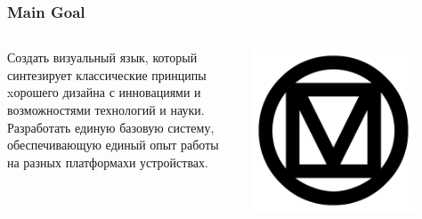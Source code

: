 \documentclass[12pt]{beamer}
\begin{document}
	\begin{frame}
		\frametitle{Main Goal}

        \begin{columns}
            \begin{column}{0.5\textwidth}
                Создать визуальный язык,
                который синтезирует классические принципы
                xорошего дизайна с инновациями
                и возможностями технологий и науки. \\

                Разработать единую базовую систему,
                обеспечивающую единый опыт работы
                на разных платформахи устройствах.
            \end{column}
            
            \begin{column}{0.5\textwidth}
                \includegraphics[width=0.8\textwidth]{md.png}
            \end{column}

        \end{columns}

	\end{frame}
\end{document}
